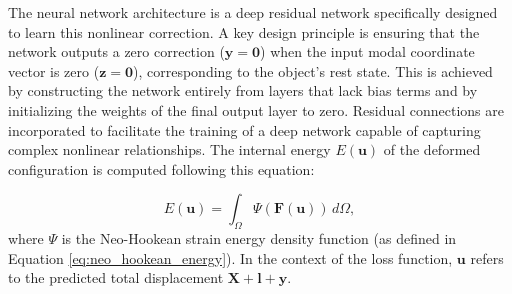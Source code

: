 \documentclass[11pt,a4paper,twocolumn]{article}
\begin{document}
The neural network architecture is a deep residual network specifically designed to learn this nonlinear correction. A key design principle is ensuring that the network outputs a zero correction ($\bm{y}=\bm{0}$) when the input modal coordinate vector is zero ($\bm{z}=\bm{0}$), corresponding to the object's rest state. This is achieved by constructing the network entirely from layers that lack bias terms and by initializing the weights of the final output layer to zero. Residual connections are incorporated to facilitate the training of a deep network capable of capturing complex nonlinear relationships.
The internal energy \( E(\bm{u}) \) of the deformed configuration is computed following this equation:


\begin{equation}
    E(\bm{u}) = \int_{\Omega} \Psi(\bm{F}(\bm{u})) \, d\Omega,
\end{equation}
where $\Psi$ is the Neo-Hookean strain energy density function (as defined in Equation \eqref{eq:neo_hookean_energy}). In the context of the loss function, $\bm{u}$ refers to the predicted total displacement $\bm{X} + \bm{l} + \bm{y}$.
\end{document}
